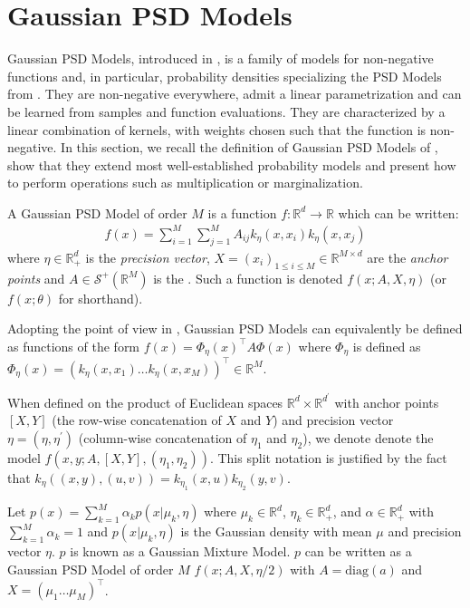 \section{Gaussian PSD Models}\label{sec:gaussian-psd-models}

Gaussian PSD Models, introduced in \cite{ciliberto2021}, is a family of models for non-negative functions and, in particular, probability densities specializing the PSD Models from \cite{ulysse-non-negative}. They are non-negative everywhere, admit a linear parametrization and can be learned from samples and function evaluations. They are characterized by a linear combination of kernels, with weights chosen such that the function is non-negative. In this section, we recall the definition of Gaussian PSD Models of \cite{ciliberto2021}, show that they extend most well-established probability models and present how to perform operations such as multiplication or marginalization.

\begin{definition}\label{def:psd-model}
   A Gaussian PSD Model of order $M$ is a function $f: \mathbb R^d \to \mathbb R$ which can be written:
   \begin{align}\label{eq:psd-model-def}
      f(x) = \sum_{i=1}^M\sum_{j=1}^M A_{ij}k_\eta(x, x_i)k_\eta(x, x_j)
   \end{align}
   where $\eta \in \mathbb R^d_+$ is the \emph{precision vector},  $X = (x_i)_{1\leq i \leq M}\in \mathbb R^{M\times d}$ are the \emph{anchor points} and $A\in\mathcal S^+(\mathbb R^M)$ is the . Such a function is denoted $f(x; A, X, \eta)$ (or $f(x;\theta)$ for shorthand).
\end{definition}

Adopting the point of view in \cite{ulysse-non-negative}, Gaussian PSD Models can equivalently be defined as functions of the form $f(x) = \Phi_\eta(x)^\top A\Phi(x)$ where $\Phi_\eta$ is defined as $\Phi_\eta(x)= (k_\eta(x, x_1) \ldots k_\eta(x, x_M))^\top \in\mathbb R^M$.

When defined on the product of Euclidean spaces $\mathbb R^d \times \mathbb R ^{d^\prime}$ with anchor points $[X, Y]$ (the row-wise concatenation of $X$ and $Y$) and precision vector $\eta = (\eta, \eta^\prime)$ (column-wise concatenation of $\eta_1$ and $\eta_2$), we denote denote the model $f(x, y ; A, [X, Y], (\eta_1, \eta_2))$. This split notation is justified by the fact that $k_\eta((x, y), (u, v)) = k_{\eta_1}(x, u)k_{\eta_2}(y, v)$.

\begin{example}\label{ex:mixtures} Let $p(x) = \sum_{k=1}^M\alpha_kp(x|\mu_k, \eta)$ where $\mu_k\in\mathbb R^d$, $\eta_k\in\mathbb R^d_+$, and $\alpha \in\mathbb R^d_+$ with $\sum_{k=1}^M\alpha_k = 1$ and $p(x|\mu_k, \eta)$ is the Gaussian density with mean $\mu$ and precision vector $\eta$. $p$ is known as a Gaussian Mixture Model. $p$ can be written as a Gaussian PSD Model of order $M$ $f(x ; A, X, \eta / 2)$ with $A=\textrm{diag}(a)$ and $X = (\mu_1 \ldots \mu_M)^\top $.
\end{example}

